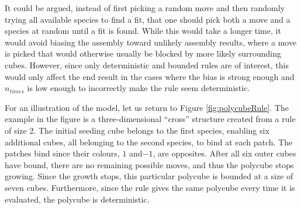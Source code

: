 It could be argued, instead of first picking a random move and then randomly trying all available species to find a fit, that one should pick both a move and a species at random until a fit is found. While this would take a longer time, it would avoid biasing the assembly toward unlikely assembly results, where a move is picked that would otherwise usually be blocked by more likely surrounding cubes. However, since only deterministic and bounded rules are of interest, this would only affect the end result in the cases where the bias is strong enough and \(n_{times}\) is low enough to incorrectly make the rule seem deterministic.


For an illustration of the model, let us return to Figure \ref{fig:polycubeRule}. The example in the figure is a three-dimensional ``cross'' structure created from a rule of size 2. The initial seeding cube belongs to the first species, enabling six additional cubes, all belonging to the second species, to bind at each patch. The patches bind since their colours, \(1\) and\( -1\), are opposites. After all six outer cubes have bound, there are no remaining possible moves, and thus the polycube stops growing. Since the growth stops, this particular polycube is bounded at a size of seven cubes. Furthermore, since the rule gives the same polycube every time it is evaluated, the polycube is deterministic.



